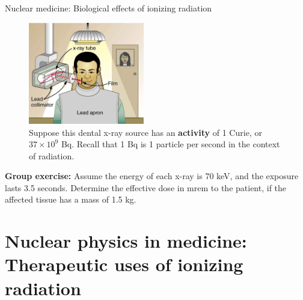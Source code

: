 \documentclass{beamer}
\begin{document}
\begin{frame}{Nuclear medicine: Biological effects of ionizing radiation}
\begin{figure}
\centering
\includegraphics[width=0.45\textwidth]{figures/dental.png}
\caption{\label{fig:dental} \footnotesize Suppose this dental x-ray source has an \textbf{activity} of 1 Curie, or $37 \times 10^9$ Bq.  Recall that 1 Bq is 1 particle per second in the context of radiation.}
\end{figure}
\footnotesize
\textbf{Group exercise:} Assume the energy of each x-ray is 70 keV, and the exposure lasts 3.5 seconds.  Determine the effective dose in mrem to the patient, if the affected tissue has a mass of 1.5 kg.
\end{frame}

\section{Nuclear physics in medicine: Therapeutic uses of ionizing radiation}
\end{document}
